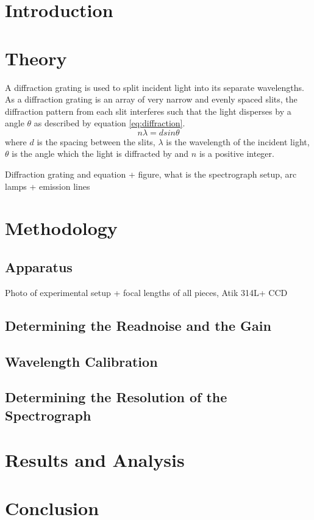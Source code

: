 \documentclass[a4paper,12pt,twocolumn]{article}
\let\cite=\supercite
\begin{document}
	\section{Introduction}
	
	\section{Theory}
		A diffraction grating is used to split incident light into its separate wavelengths. As a diffraction grating is an array of very narrow and evenly spaced slits, the diffraction pattern from each slit interferes such that the light disperses by a angle $\theta$ as described by equation \ref{eq:diffraction}\cite{hyperPhysics}.
		\begin{equation}
			n \lambda = d sin\theta
			\label{eq:diffraction}
		\end{equation} where $d$ is the spacing between the slits, $\lambda$ is the wavelength of the incident light, $\theta$ is the angle which the light is diffracted by and $n$ is a positive integer.
	
		Diffraction grating and equation + figure, what is the spectrograph setup, arc lamps + emission lines
	
	\section{Methodology}
		\subsection{Apparatus}
			Photo of experimental setup + focal lengths of all pieces, Atik 314L+ CCD
	
		\subsection{Determining the Readnoise and the Gain}
		
		\subsection{Wavelength Calibration}
	
		\subsection{Determining the Resolution of the Spectrograph}
	
	\section{Results and Analysis}
	
	\section{Conclusion}
	
	\printbibliography
\end{document}
